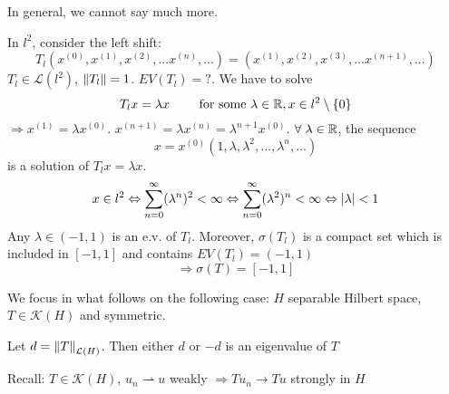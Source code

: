 In general, we cannot say much more.
\begin{example}
    
    In \(l^2\), consider the left shift:
    \[
        T_l(x^{(0)}, x^{(1)}, x^{(2)},... x^{(n)},...) = (x^{(1)}, x^{(2)}, x^{(3)},... x^{(n+1)},...)
    \]
    \(T_l \in \mathcal{L}(l^2)\), \(\norm{T_l}=1\). \(EV(T_l)=?\). We have to solve
    \[
        T_l x = \lambda x \qquad \text{ for some } \lambda \in \mathbb{R}, x \in l^2 \setminus \{0\}
    \]
    \(\Rightarrow x^{(1)}=\lambda x^{(0)}\). \(x^{(n+1)} = \lambda x^{(n)} = \lambda^{n+1} x^{(0)}\). \(\forall \; \lambda \in \mathbb{R}\), the sequence
    \[
        x = x^{(0)} \left(1, \lambda,\lambda^2, ..., \lambda^n, ...\right)
    \]
    is a solution of \(T_l x = \lambda x\).
    \[
        x \in l^2 \Leftrightarrow \sum_{n=0}^\infty (\lambda^n)^2 < \infty \Leftrightarrow \sum_{n=0}^\infty (\lambda^2)^n < \infty \Leftrightarrow \abs{\lambda} < 1
    \]
    Any \(\lambda \in (-1, 1)\) is an e.v. of \(T_l\). Moreover, \(\sigma(T_l)\) is a compact set which is included in \([-1, 1]\) and contains \(EV(T_l) =(-1, 1)\)
    \[
        \Rightarrow \sigma(T) = [-1, 1]
    \]
    
    
\end{example}
We focus in what follows on the following case: \(H\) separable Hilbert space, \(T \in \mathcal{K}(H)\) and symmetric.

\begin{proposition}
    Let \(d = \norm{T}_{\mathcal{L}(H)}\). Then either \(d\) or \(-d\) is an eigenvalue of \(T\)
\end{proposition}
Recall: \(T \in \mathcal{K}(H)\), \(u_n \rightharpoonup u\) weakly \(\Rightarrow T u_n \to Tu\) strongly in \(H\)

